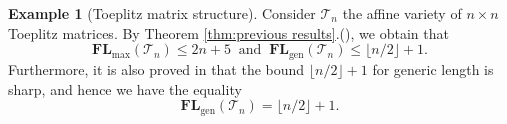 \documentclass[reqno]{amsart}
\theoremstyle{definition}
\newtheorem{example}[theorem]{Example}
\numberwithin{equation}{section}
\begin{document}
\begin{example}[Toeplitz matrix structure]\label{ex:Toeplitz}    Consider $\mathcal{T}_n$ the affine variety of $n \times n$ Toeplitz matrices. By Theorem \ref{thm:previous results}.(), we obtain that
    \begin{equation}\label{eq:generic and maximal length of toeplitz}
        \mathbf{FL}_{\text{max}}(\mathcal{T}_n) \leq 2n+5~\text{ and }~\mathbf{FL}_{\text{gen}}(\mathcal{T}_n) \leq \lfloor n/2 \rfloor +1.
    \end{equation}
    Furthermore, it is also proved in \cite[Corollary 1]{ye2016every} that the bound $\lfloor n/2 \rfloor +1$ for generic length is sharp, and hence we have the equality
    \begin{equation*}
        \mathbf{FL}_{\text{gen}}(\mathcal{T}_n) = \lfloor n/2 \rfloor +1.
    \end{equation*}
    

\end{example}
\end{document}
